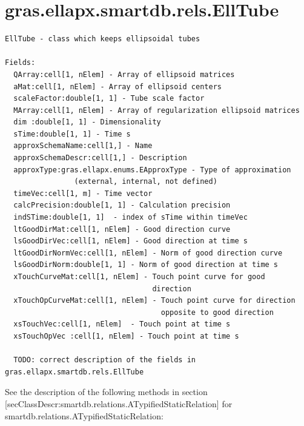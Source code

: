 \documentclass[letterpaper,10pt,english]{sphinxmanual}
\begin{document}
\section{gras.ellapx.smartdb.rels.EllTube}
\label{chap_func:gras-ellapx-smartdb-rels-elltube}
\begin{Verbatim}[commandchars=\\\{\}]
EllTube - class which keeps ellipsoidal tubes

Fields:
  QArray:cell[1, nElem] - Array of ellipsoid matrices
  aMat:cell[1, nElem] - Array of ellipsoid centers
  scaleFactor:double[1, 1] - Tube scale factor
  MArray:cell[1, nElem] - Array of regularization ellipsoid matrices
  dim :double[1, 1] - Dimensionality
  sTime:double[1, 1] - Time s
  approxSchemaName:cell[1,] - Name
  approxSchemaDescr:cell[1,] - Description
  approxType:gras.ellapx.enums.EApproxType - Type of approximation
                (external, internal, not defined)
  timeVec:cell[1, m] - Time vector
  calcPrecision:double[1, 1] - Calculation precision
  indSTime:double[1, 1]  - index of sTime within timeVec
  ltGoodDirMat:cell[1, nElem] - Good direction curve
  lsGoodDirVec:cell[1, nElem] - Good direction at time s
  ltGoodDirNormVec:cell[1, nElem] - Norm of good direction curve
  lsGoodDirNorm:double[1, 1] - Norm of good direction at time s
  xTouchCurveMat:cell[1, nElem] - Touch point curve for good
                                  direction
  xTouchOpCurveMat:cell[1, nElem] - Touch point curve for direction
                                    opposite to good direction
  xsTouchVec:cell[1, nElem]  - Touch point at time s
  xsTouchOpVec :cell[1, nElem] - Touch point at time s

  TODO: correct description of the fields in gras.ellapx.smartdb.rels.EllTube
\end{Verbatim}

See the description of the following methods in section
{[}secClassDescr:smartdb.relations.ATypifiedStaticRelation{]} for
smartdb.relations.ATypifiedStaticRelation:
\end{document}
